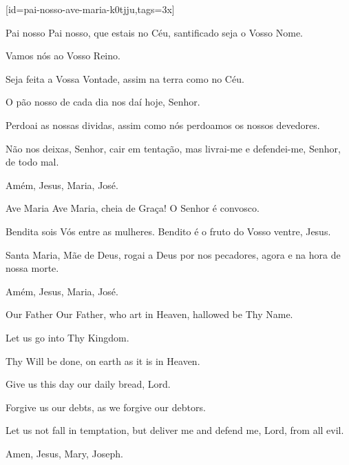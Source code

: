 %

\renewcommand{\theulSongNumber}{\Roman{ulSongNumber}}
\setcounter{ulSongNumber}{1}

[id={pai-nosso-ave-maria-k0tjju},tags={3x}]
  \vspace*{3.65ex}
  \begin{passage}[PT]{Pai nosso}
    Pai nosso,
    que estais no Céu,
    santificado seja o Vosso Nome.
    \par
    Vamos nós ao Vosso Reino.
    \par
    Seja feita a Vossa Vontade,
    assim na terra como no Céu.
    \par
    O pão nosso de cada dia nos daí hoje, Senhor.
    \par
    Perdoai as nossas dividas,
    assim como nós perdoamos os nossos devedores.
    \par
    Não nos deixas, Senhor, cair em tentação,
    mas livrai-me e defendei-me, Senhor,
    de todo mal.
    \par
    Amém, Jesus, Maria, José.
  \end{passage}
  \begin{passage}[PT]{Ave Maria}
    Ave Maria,
    cheia de Graça!
    O Senhor é convosco.
    \par
    Bendita sois Vós entre as mulheres.
    Bendito é o fruto do Vosso ventre, Jesus.
    \par
    Santa Maria, Mãe de Deus,
    rogai a Deus por nos pecadores,
    agora e na hora de nossa morte.
    \par
    Amém, Jesus, Maria, José.
  \end{passage}
  \vspace{\fill}
  \hardbrk
  \vspace*{10ex} %
  \begin{passage}[EN]{Our Father}
    Our Father,
    who art in Heaven,
    hallowed be Thy Name.
    \par
    Let us go into Thy Kingdom.
    \par
    Thy Will be done,
    on earth as it is in Heaven.
    \par
    Give us this day our daily bread, Lord.
    \par
    Forgive us our debts,
    as we forgive our debtors.
    \par
    Let us not fall in temptation,
    but deliver me and defend me, Lord,
    from all evil.
    \par
    Amen, Jesus, Mary, Joseph.
  \end{passage}
